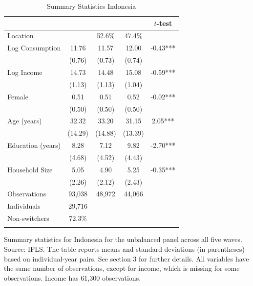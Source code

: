 \begin{table}[htbp] \centering \caption{Summary Statistics Indonesia}\label{tab:summary_stats_IDN_unb_2waves} \begin{threeparttable} \begin{tabular}{l cccc} \toprule
 &  &  &  & $t$-test \\
\midrule
Location &  &   52.6\% &   47.4\% &  \\  \addlinespace \addlinespace
Log Consumption & 11.76 & 11.57 & 12.00 & -0.43*** \\
 & (0.76) & (0.73) & (0.74) &  \\  \addlinespace
Log Income & 14.73 & 14.48 & 15.08 & -0.59*** \\
 & (1.13) & (1.13) & (1.04) &  \\  \addlinespace
Female & 0.51 & 0.51 & 0.52 & -0.02*** \\
 & (0.50) & (0.50) & (0.50) &  \\  \addlinespace
Age (years) & 32.32 & 33.20 & 31.15 & 2.05*** \\
 & (14.29) & (14.88) & (13.39) &  \\  \addlinespace
Education (years) & 8.28 & 7.12 & 9.82 & -2.70*** \\
 & (4.68) & (4.52) & (4.43) &  \\  \addlinespace
Household Size & 5.05 & 4.90 & 5.25 & -0.35*** \\
 & (2.26) & (2.12) & (2.43) &  \\  \addlinespace


\cmidrule{2-5}
Observations & 93,038 & 48,972 & 44,066 &  \\  \addlinespace
Individuals & 29,716 &  &  &  \\
Non-switchers &   72.3\% &  &  &  \\  \addlinespace
\bottomrule \end{tabular} \begin{tablenotes}[flushleft] \footnotesize \item{Summary statistics for Indonesia for the unbalanced panel across all five waves. Source: IFLS. The table reports means and standard deviations (in parentheses) based on individual-year pairs. See section 3 for further details. All variables have the same number of observations, except for income, which is missing for some observations. Income has 61,300 observations.} \end{tablenotes} \end{threeparttable} \end{table}